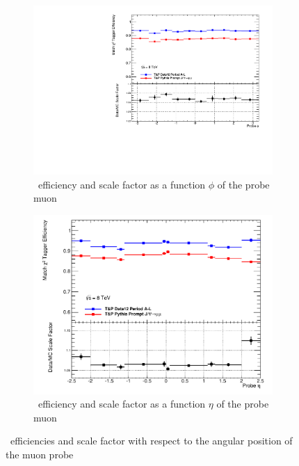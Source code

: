 \begin{figure}[tbhp]
  \centering
  \begin{subfigure}[b]{0.85\textwidth}
    \includegraphics[width=\textwidth]{PartCalibration2012/Plots/SFPlots/phi_smt.pdf}
    \caption{\xsm\ efficiency and scale factor as a function $\phi$ of the probe muon} \label{fig:CalibrationPhi}
  \end{subfigure}

  \begin{subfigure}[b]{0.85\textwidth}
    \includegraphics[width=\textwidth]{PartCalibration2012/Plots/SFPlots/eta_smt.pdf}
    \caption{\xsm\ efficiency and scale factor as a function $\eta$ of the probe muon} \label{fig:CalibrationEta}
  \end{subfigure}
  \caption{\xsm\ efficiencies and scale factor with respect to the angular position of the muon probe} \label{fig:label}
\end{figure}


